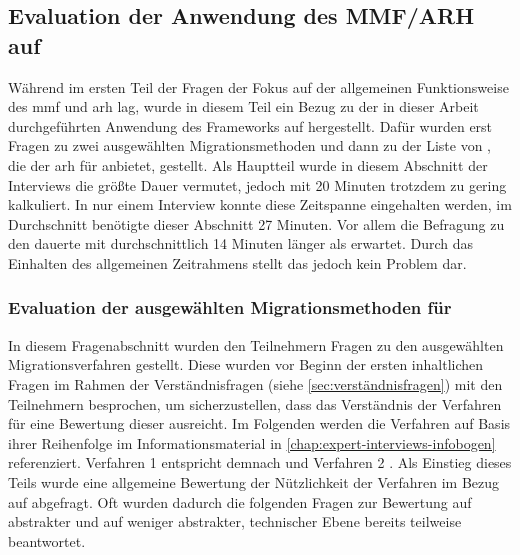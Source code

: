 \subsection{Evaluation der Anwendung des MMF/ARH auf \jf}
\label{sec:evaluation-mmf-anwendung}

Während im ersten Teil der Fragen der Fokus auf der allgemeinen Funktionsweise des \gls{mmf} und \gls{arh} lag, wurde in diesem Teil ein Bezug zu der in dieser Arbeit durchgeführten Anwendung des Frameworks auf \jf hergestellt.
Dafür wurden erst Fragen zu zwei ausgewählten Migrationsmethoden und dann zu der Liste von \bpp, die der \gls{arh} für \jf anbietet, gestellt.
Als Hauptteil wurde in diesem Abschnitt der Interviews die größte Dauer vermutet, jedoch mit 20 Minuten trotzdem zu gering kalkuliert.
In nur einem Interview konnte diese Zeitspanne eingehalten werden, im Durchschnitt benötigte dieser Abschnitt 27 Minuten.
Vor allem die Befragung zu den \bpp dauerte mit durchschnittlich 14 Minuten länger als erwartet.
Durch das Einhalten des allgemeinen Zeitrahmens stellt das jedoch kein Problem dar.

\subsubsection{Evaluation der ausgewählten Migrationsmethoden für \jf}
\label{sec:evaluation-mmf-anwendung-methoden}

In diesem Fragenabschnitt wurden den Teilnehmern Fragen zu den ausgewählten Mi\-gra\-ti\-ons\-ver\-fah\-ren gestellt.
Diese wurden vor Beginn der ersten inhaltlichen Fragen im Rahmen der Verständnisfragen (siehe \cref{sec:verständnisfragen}) mit den Teilnehmern besprochen, um sicherzustellen, dass das Verständnis der Verfahren für eine Bewertung dieser ausreicht.
Im Folgenden werden die Verfahren auf Basis ihrer Reihenfolge im Informationsmaterial in \cref{chap:expert-interviews-infobogen} referenziert.
Verfahren 1 entspricht demnach  und Verfahren 2 .
Als Einstieg dieses Teils wurde eine allgemeine Bewertung der Nützlichkeit der Verfahren im Bezug auf \jf abgefragt.
Oft wurden dadurch die folgenden Fragen zur Bewertung auf abstrakter und auf weniger abstrakter, technischer Ebene bereits teilweise beantwortet.

